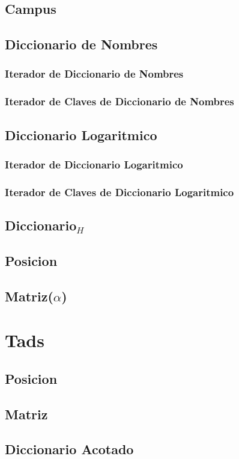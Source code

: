 \documentclass[a4paper,10pt, nofootinbib]{article}
\begin{document}
\subsection{Campus}


\subsection{Diccionario de Nombres}

\subsubsection{Iterador de Diccionario de Nombres}

\subsubsection{Iterador de Claves de Diccionario de Nombres}



\subsection{Diccionario Logaritmico}

\subsubsection{Iterador de Diccionario Logaritmico}

\subsubsection{Iterador de Claves de Diccionario Logaritmico}



\subsection{Diccionario$_H$}


\subsection{Posicion}


\subsection{Matriz($\alpha$)}



\section{Tads}
\subsection{Posicion}


\subsection{Matriz}


\subsection{Diccionario Acotado}

\end{document}
